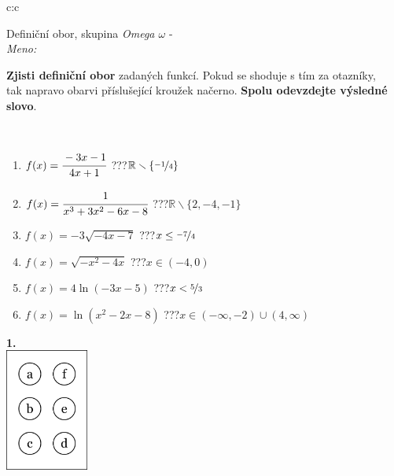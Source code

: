 \documentclass[10pt]{report}
\begin{document}
\begin{tabular}{c:c}
\begin{minipage}[c][104.5mm][t]{0.5\linewidth}
\begin{center}
\vspace{7mm}
{\huge Definiční obor, skupina \textit{Omega $\omega$} -}\\[5mm]
\textit{Meno:}\phantom{xxxxxxxxxxxxxxxxxxxxxxxxxxxxxxxxxxxxxxxxxxxxxxxxxxxxxxxxxxxxxxxxx}\\[5mm]
\begin{minipage}{0.95\linewidth}
\textbf{Zjisti definiční obor} zadaných funkcí. Pokud se shoduje s tím za otazníky,\\tak napravo obarvi příslušející kroužek načerno. \textbf{Spolu odevzdejte výsledné slovo}.
\end{minipage}
\\[1mm]
\begin{minipage}{0.79\linewidth}
\begin{center}
\begin{varwidth}{\linewidth}
\begin{enumerate}
\normalsizerrr
\item $f(x)=\cfrac{-3x-1}{4x+1}$\quad \dotfill\; ???\;\dotfill \quad $\mathbb{R}\smallsetminus\{\nicefrac{-1}{4}\}$
\item $f(x)=\cfrac{1}{x^3+3x^2-6x-8}$\quad \dotfill\; ???\;\dotfill \quad $\mathbb{R}\smallsetminus\{2,-4,-1\}$
\item $f(x)=-3\sqrt{-4x-7}$\quad \dotfill\; ???\;\dotfill \quad $x\leq\nicefrac{-7}{4}$
\item $f(x)=\sqrt{-x^2-4x}$\quad \dotfill\; ???\;\dotfill \quad $x\in(-4 , 0)$
\item $f(x)=4\ln{(-3x-5)}$\quad \dotfill\; ???\;\dotfill \quad $x<\nicefrac{5}{3}$
\item $f(x)=\ln{(x^2-2x-8)}$\quad \dotfill\; ???\;\dotfill \quad $x\in(-\infty , -2)\cup(4 , \infty)$
\end{enumerate}
\end{varwidth}
\end{center}
\end{minipage}
\begin{minipage}{0.20\linewidth}
\begin{center}
{\Huge\bfseries 1.} \\[2mm]
\includegraphics[height=40mm]{../images/braille.png}

\end{center}
\end{minipage}
\end{center}
\end{minipage}
\end{tabular}
\end{document}
